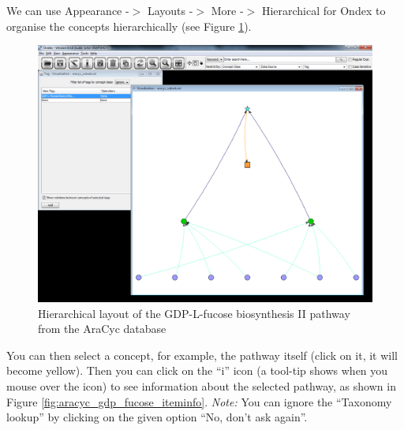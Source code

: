 We can use Appearance -$>$ Layouts -$>$ More -$>$ Hierarchical for Ondex to organise the concepts hierarchically (see Figure \ref{fig:aracyc_gdp_fucose_hierarchical}).
\begin{figure}[H]
\centering
\includegraphics[scale=0.3]{images/Jun12/aracyc_gdp_fucose_hierarchical.png} 
\caption{Hierarchical layout of the GDP-L-fucose biosynthesis II pathway from the AraCyc database}
\label{fig:aracyc_gdp_fucose_hierarchical}
\end{figure}

You can then select a concept, for example, the pathway itself (click on it, it will become yellow).
Then you can click on the ``i'' icon (a tool-tip shows when you mouse over the icon) to see information about the selected pathway, as shown in Figure \ref{fig:aracyc_gdp_fucose_iteminfo}. \emph{Note:} You can ignore the ``Taxonomy lookup'' by clicking on the given option ``No, don't ask again''.


